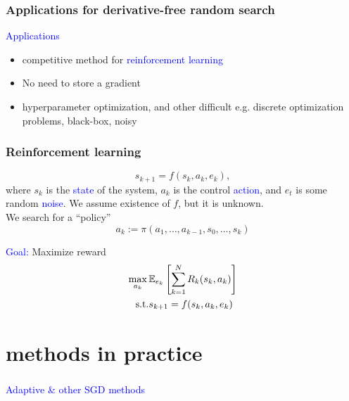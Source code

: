 \documentclass[aspectratio=149]{beamer}
\begin{document}
\begin{frame}
  \frametitle{Applications for derivative-free random search}

  \textcolor{blue}{Applications}
  \begin{itemize}
    \item competitive method for \textcolor{blue}{reinforcement learning}
    \item No need to store a gradient
    \item hyperparameter optimization, and other difficult e.g. discrete optimization
problems, black-box, noisy
  \end{itemize}
\end{frame}


\begin{frame}
  \frametitle{Reinforcement learning}
  \begin{equation}
    s_{k+1} = f(s_k, a_k, e_k),
  \end{equation}
  where $s_k$ is the \textcolor{blue}{state} of the system, $a_k$ is the control \textcolor{blue}{action}, and $e_t$ is some random \textcolor{blue}{noise}. We assume existence of $f$, but it is unknown.\\
  \medskip
  We search for a ``policy''
  \begin{equation}
    a_k := \pi(a_1, \dots, a_{k-1}, s_0, \dots, s_k)
  \end{equation}

  \medskip
  \textcolor{blue}{Goal:} Maximize reward
  \begin{equation}
    \begin{aligned}
       \max_{a_k}\, &\mathbb{E}_{e_k} \left[ \sum_{k=1}^N R_k(s_k, a_k)\right]\\
       \text{s.t.} & s_{k+1}=f(s_k, a_k, e_k)
    \end{aligned}
  \end{equation}
\end{frame}

\section{methods in practice}%
\label{sec:}

\begin{frame}
  \frametitle{}
  \begin{center}
    \Huge\textcolor{blue}{Adaptive \& other SGD methods}\\
  \end{center}
\end{frame}
\end{document}
